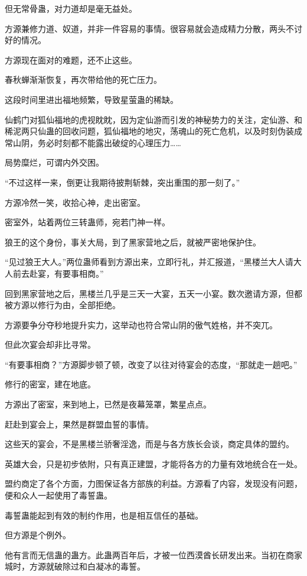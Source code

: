 \begin{this_body}
但无常骨蛊，对力道却是毫无益处。

方源兼修力道、奴道，并非一件容易的事情。很容易就会造成精力分散，两头不讨好的情况。

方源现在面对的难题，还不止这些。

春秋蝉渐渐恢复，再次带给他的死亡压力。

这段时间里进出福地频繁，导致星萤蛊的稀缺。

仙鹤门对狐仙福地的虎视眈眈，因为定仙游而引发的神秘势力的关注，定仙游、和稀泥两只仙蛊的回收问题，狐仙福地的地灾，荡魂山的死亡危机，以及时刻伪装成常山阴，务必时刻都不能露出破绽的心理压力……

局势糜烂，可谓内外交困。

“不过这样一来，倒更让我期待披荆斩棘，突出重围的那一刻了。”

方源冷然一笑，收拾心神，走出密室。

密室外，站着两位三转蛊师，宛若门神一样。

狼王的这个身份，事关大局，到了黑家营地之后，就被严密地保护住。

“见过狼王大人。”两位蛊师看到方源出来，立即行礼，并汇报道，“黑楼兰大人请大人前去赴宴，有要事相商。”

回到黑家营地之后，黑楼兰几乎是三天一大宴，五天一小宴。数次邀请方源，但都被方源以修行为由，全部拒绝。

方源要争分夺秒地提升实力，这举动也符合常山阴的傲气姓格，并不突兀。

但此次宴会却非比寻常。

“有要事相商？”方源脚步顿了顿，改变了以往对待宴会的态度，“那就走一趟吧。”

修行的密室，建在地底。

方源出了密室，来到地上，已然是夜幕笼罩，繁星点点。

赶赴到宴会上，果然是群盟血誓的事情。

这些天的宴会，不是黑楼兰骄奢淫逸，而是与各方族长会谈，商定具体的盟约。

英雄大会，只是初步依附，只有真正建盟，才能将各方的力量有效地统合在一处。

盟约商定了各个方面，力图保证各方部族的利益。方源看了内容，发现没有问题，便和众人一起使用了毒誓蛊。

毒誓蛊能起到有效的制约作用，也是相互信任的基础。

但方源是个例外。

他有言而无信蛊的蛊方。此蛊两百年后，才被一位西漠酋长研发出来。当初在商家城时，方源就破除过和白凝冰的毒誓。


\end{this_body}
